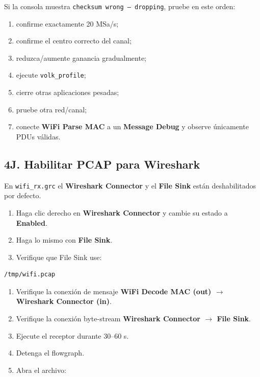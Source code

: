 Si la consola muestra \texttt{checksum wrong -- dropping}, pruebe en este orden:

\begin{enumerate}
    \item confirme exactamente 20 MSa/s;
    \item confirme el centro correcto del canal;
    \item reduzca/aumente ganancia gradualmente;
    \item ejecute \texttt{volk\_profile};
    \item cierre otras aplicaciones pesadas;
    \item pruebe otra red/canal;
    \item conecte \textbf{WiFi Parse MAC} a un \textbf{Message Debug} y observe únicamente PDUs válidas.
\end{enumerate}

\subsection{4J. Habilitar PCAP para Wireshark}

En \texttt{wifi\_rx.grc} el \textbf{Wireshark Connector} y el \textbf{File Sink} están deshabilitados por defecto.

\begin{enumerate}
    \item Haga clic derecho en \textbf{Wireshark Connector} y cambie su estado a \textbf{Enabled}.
    \item Haga lo mismo con \textbf{File Sink}.
    \item Verifique que File Sink use:
\end{enumerate}

\begin{lstlisting}
/tmp/wifi.pcap
\end{lstlisting}

\begin{enumerate}[resume]
    \item Verifique la conexión de mensaje \textbf{WiFi Decode MAC (out) $\rightarrow$ Wireshark Connector (in)}.
    \item Verifique la conexión byte-stream \textbf{Wireshark Connector $\rightarrow$ File Sink}.
    \item Ejecute el receptor durante 30--60 s.
    \item Detenga el flowgraph.
    \item Abra el archivo:
\end{enumerate}

